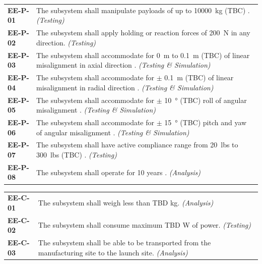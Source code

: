 \documentclass[12pt, letterpaper]{article}
\begin{document}
\begin{longtable}{P{2cm}P{13.75cm}}
\textbf{EE-P-01}	& The subsystem shall manipulate payloads of up to \SI{10000}{\kg} (TBC) \cite{RFP}. \textit{(Testing)}					\\
\textbf{EE-P-02}	& The subsystem shall apply holding or reaction forces of \SI{200}{\N} in any direction. \textit{(Testing)}			\\
\textbf{EE-P-03}	& The subsystem shall accommodate for \SI{0}{\m} to \SI{0.1}{\m} (TBC) of linear misalignment in axial direction \cite{NASAsysreq_Kumar}. \textit{(Testing \& Simulation)}						\\
\textbf{EE-P-04}	& The subsystem shall accommodate for $\pm$ \SI{0.1}{\m} (TBC) of linear misalignment in radial direction \cite{NASAsysreq_Kumar}. \textit{(Testing \& Simulation)}						\\
\textbf{EE-P-05}	& The subsystem shall accommodate for $\pm$ \SI{10}{\degree} (TBC) roll of angular misalignment \cite{NASAsysreq_Kumar}. \textit{(Testing \& Simulation)}									\\
\textbf{EE-P-06}	& The subsystem shall accommodate for $\pm$ \SI{15}{\degree} (TBC) pitch and yaw of angular misalignment \cite{NASAsysreq_Kumar}. \textit{(Testing \& Simulation)}									\\
\textbf{EE-P-07}	& The subsystem shall have active compliance range from \SI{20}{lbs} to \SI{300}{lbs} (TBC) \cite{NASAEE_Mishkin}.	\textit{(Testing)}													\\
\textbf{EE-P-08}	& The subsystem shall operate for 10 years \cite{RFP}. \textit{(Analysis)}										\\
\end{longtable}
\vspace{-10pt}
\begin{longtable}{P{2cm}P{13.75cm}}
\textbf{EE-C-01}	& The subsystem shall weigh less than TBD \si{\kg}. \textit{(Analysis)}													\\
\textbf{EE-C-02}	& The subsystem shall consume maximum TBD \si{\watt} of power. \textit{(Testing)}								\\
\textbf{EE-C-03}	& The subsystem shall be able to be transported from the manufacturing site to the launch site. \textit{(Analysis)}	\\
\end{longtable}
\vspace{-10pt}
\end{document}
